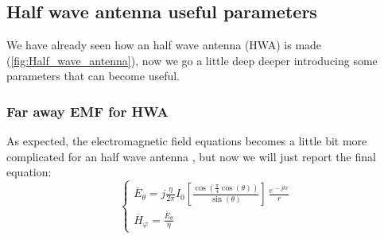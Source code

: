 \subsection*{Half wave antenna useful parameters}
We have already seen how an half wave antenna (HWA) is made (\cref{fig:Half_wave_antenna}), now we go a little deep deeper introducing some parameters that can become useful.
\subsubsection*{Far away EMF for HWA}
As expected, the electromagnetic field equations becomes a little bit more complicated for an half wave antenna , but now we will just report the final equation:
\begin{equation}
    \begin{cases}
        \overline{E}_\theta=j\frac{\eta}{2\pi}I_0\left[\frac{\cos(\frac{\pi}{4}\cos(\theta))}{\sin(\theta)}\right]\,\frac{e^{\,-jkr}}{r}\\[5pt]
        \overline{H}_\varphi=\frac{\overline{E}_\theta}{\eta}
    \end{cases}
\end{equation}
